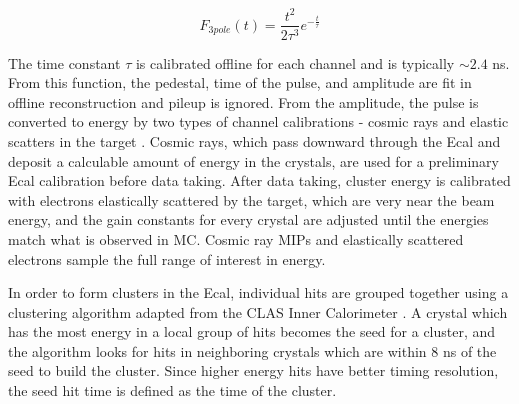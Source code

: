 \begin{equation}
    F_{3pole}(t) = \frac{t^2}{2 \tau^3}e^{-\frac{t}{\tau}}
    \label{eqn:ecal_recon}
\end{equation}

The time constant $\tau$ is calibrated offline for each channel and is typically $\sim 2.4$ ns. From this function, the pedestal, time of the pulse, and amplitude are fit in offline reconstruction and pileup is ignored. From the amplitude, the pulse is converted to energy by two types of channel calibrations - cosmic rays and elastic scatters in the target \cite{ecalpulse}. Cosmic rays, which pass downward through the Ecal and deposit a calculable amount of energy in the crystals, are used for a preliminary Ecal calibration before data taking. After data taking, cluster energy is calibrated with electrons elastically scattered by the target, which are very near the beam energy, and the gain constants for every crystal are adjusted until the energies match what is observed in MC. Cosmic ray MIPs and elastically scattered electrons sample the full range of interest in energy.



In order to form clusters in the Ecal, individual hits are grouped together using a clustering algorithm adapted from the CLAS Inner Calorimeter \cite{ASRYAN2020163425}. A crystal which has the most energy in a local group of hits becomes the seed for a cluster, and the algorithm looks for hits in neighboring crystals which are within 8 ns of the seed to build the cluster. Since higher energy hits have better timing resolution, the seed hit time is defined as the time of the cluster. %

